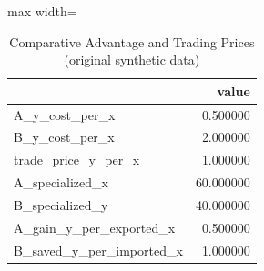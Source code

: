 \begin{table}[htbp]
\centering
\caption{Comparative Advantage and Trading Prices (original synthetic data)}
\begingroup
\small
\setlength{\tabcolsep}{6pt}
\renewcommand{\arraystretch}{1.12}
\begin{adjustbox}{max width=\linewidth}
\begin{tabular}{@{}lr@{}}
\toprule
 & value \\
\midrule
A\_y\_cost\_per\_x & 0.500000 \\
B\_y\_cost\_per\_x & 2.000000 \\
trade\_price\_y\_per\_x & 1.000000 \\
A\_specialized\_x & 60.000000 \\
B\_specialized\_y & 40.000000 \\
A\_gain\_y\_per\_exported\_x & 0.500000 \\
B\_saved\_y\_per\_imported\_x & 1.000000 \\
\bottomrule
\end{tabular}
\end{adjustbox}
\endgroup
\end{table}